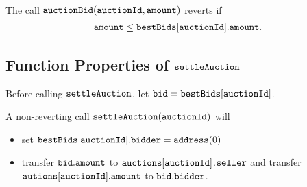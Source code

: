 \documentclass[a4paper,10pt]{article}
\begin{document}
\paragraph{}

The call $\texttt{auctionBid}(\texttt{auctionId}, \texttt{amount})$ reverts if
\begin{align*}
\texttt{amount} \le \texttt{bestBids}[\texttt{auctionId}].\texttt{amount}\text{.}
\end{align*}

\subsection*{Function Properties of $\texttt{settleAuction}$}

Before calling $\texttt{settleAuction}$, let $\texttt{bid} = \texttt{bestBids}[\texttt{auctionId}]$.

A non-reverting call $\texttt{settleAuction}(\texttt{auctionId})$ will
\begin{itemize}
\item set $\texttt{bestBids}[\texttt{auctionId}].\texttt{bidder} = \texttt{address}(0)$
\item transfer $\texttt{bid}.\texttt{amount}$ to $\texttt{auctions}[\texttt{auctionId}]$.$\texttt{seller}$ and transfer
$\texttt{autions}[\texttt{auctionId}].\texttt{amount}$ to $\texttt{bid}.\texttt{bidder}$.
\end{itemize}
\end{document}
